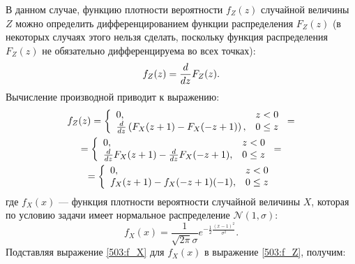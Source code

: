 В данном случае, функцию плотности вероятности $f_Z(z)$ случайной величины $Z$ можно определить дифференцированием функции распределения $F_Z(z)$ (в некоторых случаях этого
нельзя сделать, поскольку функция распределения $F_Z(z)$ не обязательно дифференцируема во всех точках):
\begin{equation}
    f_Z(z) = \frac{d}{dz} F_Z(z) .
\end{equation}
Вычисление производной приводит к выражению:
\begin{multline}
    \label{503:f_Z}
    f_Z(z)
    = \left \{
    \begin{array}{ll}
        0,                                                        & z < 0    \\
        \frac{d}{dz} \left ( F_X(z + 1) - F_X(-z + 1) \right ), & 0 \leq z
    \end{array}
    \right . = \\
    = \left \{
    \begin{array}{ll}
        0,                                                      & z < 0    \\
        \frac{d}{dz} F_X(z + 1) - \frac{d}{dz} F_X(-z + 1), & 0 \leq z
    \end{array}
    \right . = \\
    = \left \{
    \begin{array}{ll}
        0,                            & z < 0    \\
        f_X(z + 1) - f_X(-z + 1)(-1), & 0 \leq z
    \end{array}
    \right .
\end{multline}
где $f_X(x)$ --- функция плотности вероятности случайной величины $X$, которая по условию задачи имеет нормальное распределение $\mathcal{N}(1,\sigma)$:
\begin{equation}
    \label{503:f_X}
    f_X(x) = \frac{1}{\sqrt{2 \pi} \sigma} e^{-\frac{1}{2} \frac{\left ( x - 1 \right )^2}{\sigma^2}} .
\end{equation}
Подставляя выражение \eqref{503:f_X} для $f_X(x)$ в выражение \eqref{503:f_Z}, получим:
